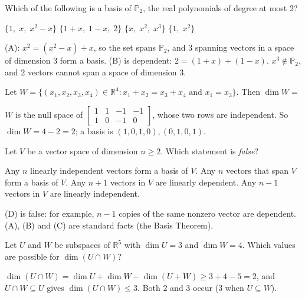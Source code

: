 \begin{question}[id=basis-5, marks=2]
Which of the following is a basis of $\mathbb{P}_2$, the real polynomials of degree at most 2?
\begin{options}
  \correct $\{1,\; x,\; x^2 - x\}$
  \option $\{1 + x,\; 1 - x,\; 2\}$
  \option $\{x,\; x^2,\; x^3\}$
  \option $\{1,\; x^2\}$
\end{options}
\begin{solution}
(A): $x^2 = (x^2 - x) + x$, so the set spans $\mathbb{P}_2$, and 3 spanning vectors in a space of dimension 3 form a basis. (B) is dependent: $2 = (1 + x) + (1 - x)$. $x^3 \notin \mathbb{P}_2$, and 2 vectors cannot span a space of dimension 3.
\end{solution}
\end{question}

\begin{question}[id=basis-6, marks=2]
Let $W = \{(x_1, x_2, x_3, x_4) \in \mathbb{R}^4 : x_1 + x_2 = x_3 + x_4 \text{ and } x_1 = x_3\}$. Then $\dim W =$
\begin{solution}
$W$ is the null space of $\begin{bmatrix} 1 & 1 & -1 & -1 \\ 1 & 0 & -1 & 0 \end{bmatrix}$, whose two rows are independent. So $\dim W = 4 - 2 = 2$; a basis is $(1, 0, 1, 0), (0, 1, 0, 1)$.
\end{solution}
\end{question}

\begin{question}[id=basis-7]
Let $V$ be a vector space of dimension $n \ge 2$. Which statement is \emph{false}?
\begin{options}
  \option Any $n$ linearly independent vectors form a basis of $V$.
  \option Any $n$ vectors that span $V$ form a basis of $V$.
  \option Any $n + 1$ vectors in $V$ are linearly dependent.
  \correct Any $n - 1$ vectors in $V$ are linearly independent.
\end{options}
\begin{solution}
(D) is false: for example, $n - 1$ copies of the same nonzero vector are dependent. (A), (B) and (C) are standard facts (the Basis Theorem).
\end{solution}
\end{question}

\begin{question}[id=basis-8, type=msq, marks=2]
Let $U$ and $W$ be subspaces of $\mathbb{R}^5$ with $\dim U = 3$ and $\dim W = 4$. Which values are possible for $\dim(U \cap W)$?
\begin{options}
\end{options}
\begin{solution}
$\dim(U \cap W) = \dim U + \dim W - \dim(U + W) \ge 3 + 4 - 5 = 2$, and $U \cap W \subseteq U$ gives $\dim(U \cap W) \le 3$. Both 2 and 3 occur (3 when $U \subseteq W$).
\end{solution}
\end{question}

